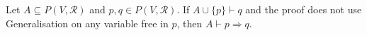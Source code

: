 Let $A \subseteq P(V, \mathcal{R})$ and $p, q \in P(V, \mathcal{R})$. If $A \cup \{p\} \vdash q$ and the proof does not use Generalisation on any variable free in $p$, then $A \vdash p \Rightarrow q$.
